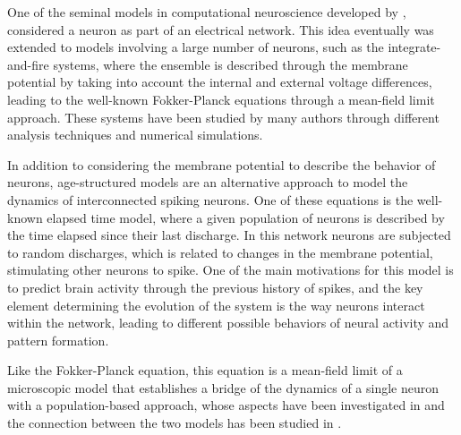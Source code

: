 \documentclass[11pt,a4paper]{article}
\begin{document}
One of the seminal models in computational neuroscience developed by \cite{lapicque}, considered a neuron as part of an electrical network. This idea eventually was extended to models involving a large number of neurons, such as the integrate-and-fire systems, where the ensemble is described through the membrane potential by taking into account the internal and external voltage differences, leading to the well-known Fokker-Planck equations through a mean-field limit approach. These systems have been studied by many authors \cite{caceres2011analysis,carrillo2015qualitative,caceres2021understanding,carrillo2023noise,caceres2019global,ikeda2022theoretical,caceres2025asymptotic,caceres2024sequence} through different analysis techniques and numerical simulations.


In addition to considering the membrane potential to describe the behavior of neurons, age-structured models are an alternative approach to model the dynamics of interconnected spiking neurons. One of these equations is the well-known elapsed time model, where a given population of neurons is described by the {time elapsed} since their last discharge. In this network neurons are subjected to random discharges, which is related to changes in the membrane potential, stimulating other neurons to spike. One of the main motivations for this model is to predict brain activity through the previous history of spikes, and the key element determining the evolution of the system is the way neurons interact within the network, leading to different possible behaviors of neural activity and pattern formation.

Like the Fokker-Planck equation, this equation is a mean-field limit of a microscopic model that establishes a bridge of the dynamics of a single neuron with a population-based approach, whose aspects have been investigated in \cite{pham1998activity,ly2009spike,chevallier2015microscopic,chevallier2015mean,quininao2016microscopic,schwalger2019mind} and the connection between the two models has been studied in \cite{dumont2016noisy,dumont2020theoretical}.
\end{document}
